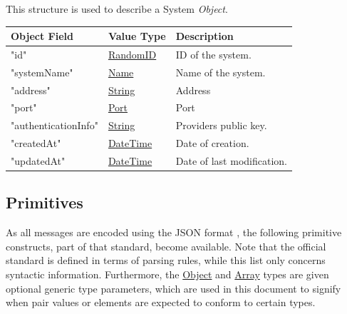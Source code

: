 \documentclass[a4paper]{arrowhead}
\newcommand{\pref}[1]{{\textcolor{ArrowheadGrey}{\hyperref[sec:model:primitives:#1]{#1}}}}
\begin{document}

This structure is used to describe a System \textit{Object}.

\begin{table}[ht!]
\begin{tabularx}{\textwidth}{| p{5cm} | p{3.5cm} | X |} \hline
\rowcolor{gray!33} Object Field & Value Type      & Description \\ \hline
"id"                  & \pref{RandomID}   & ID of the system. \\ \hline
"systemName"          & \pref{Name}       & Name of the system. \\ \hline
"address"             & \pref{String}     & Address \\ \hline
"port"                & \pref{Port}       & Port \\ \hline
"authenticationInfo"  & \pref{String}     & Providers public key. \\ \hline
"createdAt"           & \pref{DateTime}   & Date of creation. \\ \hline
"updatedAt"           & \pref{DateTime}   & Date of last modification. \\ \hline


\end{tabularx}
\end{table}


\subsection{Primitives}
\label{sec:model:primitives}

As all messages are encoded using the JSON format \cite{bray2014json}, the following primitive constructs, part of that standard, become available.
Note that the official standard is defined in terms of parsing rules, while this list only concerns syntactic information.
Furthermore, the \pref{Object} and \pref{Array} types are given optional generic type parameters, which are used in this document to signify when pair values or elements are expected to conform to certain types. 
\end{document}
